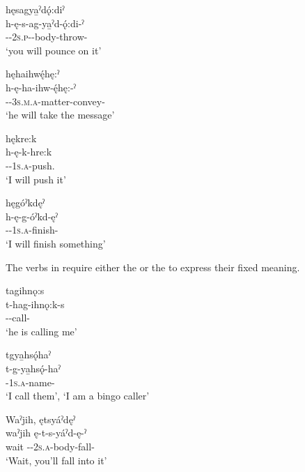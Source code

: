 \ex hęsagya̱ˀdǫ́:diˀ\\
\gll h-ę-s-ag-ya̱ˀd-ǫ́:di-ˀ\\
{\translocative}-{\future}-\textsc{2s.p}-{\semireflexive}-body-throw-{\punctual}\\
\glt `you will pounce on it'

\ex hęhaihwę́hę:ˀ\\
\gll h-ę-ha-ihw-ę́hę:-ˀ\\
{\translocative}-{\future}-\textsc{3s.m.a}-matter-convey-{\punctual}\\
\glt `he will take the message'

\ex hękre:k\\
\gll h-ę-k-hre:k\\
{\translocative}-{\future}-\textsc{1s.a}-push.{\zeropunctual}\\
\glt `I will push it'

\ex hęgóˀkdęˀ\\
\gll h-ę-g-óˀkd-ęˀ\\
{\translocative}-{\future}-\textsc{1s.a}-finish-{\punctual}\\
\glt `I will finish something'
\z
\z

The verbs in  require either the  {\cislocative} or the  \textsc{\translocative} to express their fixed meaning.

\ea\label{ex:dhex14}

\ea tagihnǫ:s\\
\gll t-hag-ihnǫ:k-s\\
{\cislocative}--call-{\habitual}\\
\glt `he is calling me'

\ex tgya̱hsǫ́haˀ\\
\gll t-g-ya̱hsǫ́-haˀ\\
{\cislocative}-\textsc{1s.a}-name-{\habitual}\\
\glt  ‘I call them’, `I am a bingo caller'
\newpage
{}

\ex Waˀjih, ętsyáˀdęˀ\\
\gll waˀjih ę-t-s-yáˀd-ę-ˀ\\
wait \fut-{\cislocative}-\textsc{2s.a}-body-fall-{\punctual}\\
\glt `Wait, you’ll fall into it'
\z
\z

